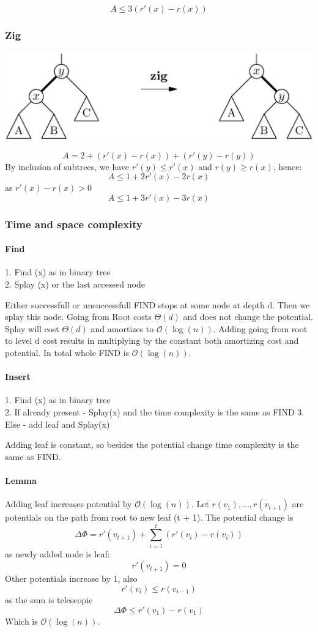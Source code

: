 \documentclass[12pt]{article}
\newcommand{\bigO}{\mathcal{O}}
\newcommand{\bigOlog}{\bigO(\log(n))}
\begin{document}
\[ A \leq 3(r'(x) - r(x)) \]

\subsubsection*{Zig}
\includegraphics[scale=0.4]{zig.eps}

\[ A = 2 + (r'(x) - r(x)) + (r'(y) - r(y)) \]
By inclusion of subtrees, we have $ r'(y) \leq r'(x) $ and $ r(y) \geq r(x) $, hence:
\[ A \leq 1 + 2r'(x) - 2r(x) \]
as $ r'(x) - r(x) > 0 $
\[ A \leq 1 + 3r'(x) - 3r(x) \]

\subsubsection{Time and space complexity}

\paragraph{Find}
1. Find (x) as in binary tree \\
2. Splay (x) or the last accessed node

Either successfull or unsuccessfull FIND stops at some node at depth d. Then we splay this node.
Going from Root costs $ \Theta(d) $ and does not change the potential. Splay will cost $ \Theta(d) $ and amortizes to $\bigO(\log(n))$. Adding going from root to level d cost results in multiplying by the constant both amortizing cost and potential. In total whole FIND is $\bigO(\log(n))$.

\paragraph{Insert}

1. Find (x) as in binary tree \\
2. If already present - Splay(x) and the time complexity is the same as FIND
3. Else - add leaf and Splay(x)

Adding leaf is constant, so besides the potential change time complexity is the same as FIND.

\paragraph{Lemma} Adding leaf increases potential by $\bigO(\log(n))$.
Let $ r(v_1), ... , r(v_{t+1}) $ are potentials on the path from root to new leaf (t + 1). The potential change is
\[ \Delta \Phi = r'(v_{t+1}) + \sum_{i = 1}^t (r'(v_i) - r(v_i)) \]
as newly added node is leaf:
\[ r'(v_{t+1}) = 0 \]
Other potentials increase by 1, also
\[ r'(v_i) \leq r(v_{i - 1}) \]
as the sum is telescopic
\[ \Delta \Phi \leq r'(v_1) - r(v_1) \]
Which is $\bigOlog$.
\end{document}
